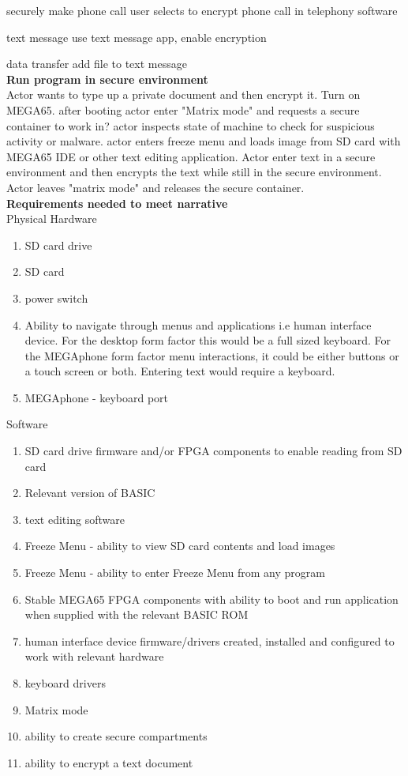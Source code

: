 securely make phone call
user selects to encrypt phone call in telephony software

text message
use text message app, enable encryption

data transfer
add file to text message\\

\textbf{Run program in secure environment}\\
Actor wants to type up a private document and then encrypt it. Turn on MEGA65. after booting actor enter "Matrix mode" and requests a secure container to work in? actor inspects state of machine to check for suspicious activity or malware. 
actor enters freeze menu and loads image from SD card with MEGA65 IDE or other text editing application. Actor enter text in a secure environment and then encrypts the text while still in the secure environment. Actor leaves "matrix mode" and releases the secure container.\\

\textbf{Requirements needed to meet narrative}\\
Physical Hardware
\begin{enumerate}
\item SD card drive
\item SD card
\item power switch
\item Ability to navigate through menus and applications i.e human interface device. For the desktop form factor this would be a full sized keyboard. For the MEGAphone form factor menu interactions, it could be either buttons or a touch screen or both. Entering text would require a keyboard.
\item MEGAphone - keyboard port
\end{enumerate}

Software\\
\begin{enumerate}
\item SD card drive firmware and/or FPGA components to enable reading from SD card
\item Relevant version of BASIC 
\item text editing software
\item Freeze Menu - ability to view SD card contents and load images
\item Freeze Menu - ability to enter Freeze Menu from any program
\item Stable MEGA65 FPGA components with ability to boot and run application when supplied with the relevant BASIC ROM
\item human interface device firmware/drivers created, installed and configured to work with relevant hardware
\item keyboard drivers
\item Matrix mode
\item ability to create secure compartments
\item ability to encrypt a text document
\end{enumerate}

